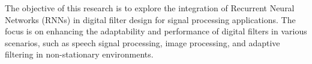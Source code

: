 The objective of this research is to explore the integration of Recurrent Neural Networks (RNNs) in digital filter design for signal processing applications. The focus is on enhancing the adaptability and performance of digital filters in various scenarios, such as speech signal processing, image processing, and adaptive filtering in non-stationary environments.
